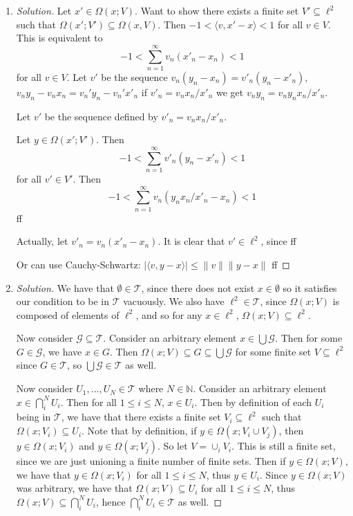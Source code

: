 \documentclass{article}
\newcommand{\N}{{\mathbb N}}
\begin{document}
\begin{enumerate}
	\item \begin{proof}[Solution]\let\qed\relax
		Let $x' \in \Omega(x;V)$.
		Want to show there exists a finite set $V' \subseteq \ell^2$
		such that $\Omega(x';V') \subseteq \Omega(x,V)$.
		Then $-1 < \langle v, x' - x \rangle < 1$ for all $v \in V$.
		This is equivalent to
		\[
			-1 < \sum_{n = 1}^\infty v_n(x'_n - x_n) < 1
		\]
		for all $v \in V$.
		Let $v'$ be the sequence $v_n(y_n - x_n) = v'_n(y_n - x'_n)$,
		$v_ny_n - v_nx_n = v_n'y_n - v_n'x'_n$
		if $v'_n = v_nx_n/x'_n$ we get $v_ny_n = v_ny_nx_n/x'_n$.

		Let $v'$ be the sequence defined by $v'_n = v_nx_n/x'_n$.

		Let $y \in \Omega(x';V')$.
		Then
		\[
			-1 < \sum_{n=1}^\infty v'_n(y_n - x'_n) < 1
		\]
		for all $v' \in V'$.
		Then
		\[
			-1 < \sum_{n=1}^\infty v_n(y_nx_n/x'_n - x_n) < 1
		\]
		ff

		Actually, let $v'_n = v_n(x'_n - x_n)$.
		It is clear that $v' \in \ell^2$,
		since ff

		Or can use Cauchy-Schwartz: $|\langle v, y-x \rangle|
		\leq \lVert v \rVert \lVert y-x \rVert$
		ff
	\end{proof}
	\item \begin{proof}[Solution]\let\qed\relax
		We have that $\emptyset \in \mathcal{T}$,
		since there does not exist $x \in \emptyset$ so it
		satisfies our condition to be in $\mathcal{T}$ vacuously.
		We also have $\ell^2 \in \mathcal{T}$,
		since $\Omega(x;V)$ is composed of elements of $\ell^2$,
		and so for any $x \in \ell^2$, $\Omega(x;V) \subseteq \ell^2$.
		
		Now consider $\mathcal{G} \subseteq \mathcal{T}$.
		Consider an arbitrary element $x \in \bigcup \mathcal{G}$.
		Then for some $G \in \mathcal{G}$, we have $x \in G$.
		Then $\Omega(x;V) \subseteq G \subseteq \bigcup\mathcal{G}$
		for some finite set $V \subseteq \ell^2$ since $G \in \mathcal{T}$,
		so $\bigcup \mathcal{G} \in \mathcal{T}$ as well.

		Now consider $U_1,\dots,U_N \in \mathcal{T}$ where $N \in \N$.
		Consider an arbitrary element $x \in \bigcap_i^N U_i$.
		Then for all $1 \leq i \leq N$, $x \in U_i$.
		Then by definition of each $U_i$ being in $\mathcal{T}$,
		we have that there exists a finite set $V_i \subseteq \ell^2$
		such that $\Omega(x;V_i) \subseteq U_i$.
		Note that by definition, if $y \in \Omega(x; V_i \cup V_j)$,
		then $y \in \Omega(x; V_i)$ and $y \in \Omega(x; V_j)$.
		So let $V = \cup_i V_i$. This is still a finite set,
		since we are just unioning a finite number of finite sets.
		Then if $y \in \Omega(x;V)$, we have that $y \in \Omega(x;V_i)$
		for all $1 \leq i \leq N$,
		thus $y \in U_i$.
		Since $y \in \Omega(x;V)$ was arbitrary, we have that
		$\Omega(x;V) \subseteq U_i$ for all $1 \leq i \leq N$,
		thus $\Omega(x;V) \subseteq \bigcap_i^N U_i$,
		hence $\bigcap_i^N U_i \in \mathcal{T}$ as well.


\end{proof}
\end{enumerate}
\end{document}
